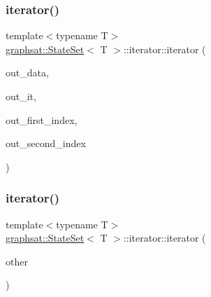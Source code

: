 \mbox{\label{classgraphsat_1_1_state_set_1_1iterator_a1b8267daf558c09335c788da43e76c77}} 
\subsubsection{\texorpdfstring{iterator()}{iterator()}\hspace{0.1cm}{\footnotesize\ttfamily [2/3]}}
{\footnotesize\ttfamily template$<$typename T$>$ \\
\mbox{\hyperlink{classgraphsat_1_1_state_set}{graphsat\+::\+State\+Set}}$<$ T $>$\+::iterator\+::iterator (\begin{DoxyParamCaption}\item[{\mbox{\hyperlink{classgraphsat_1_1_state_set_a6474a59203fade7146aacfd0e277ecf4}{State\+Set\+\_\+t}} $\ast$}]{out\+\_\+data,  }\item[{typename unordered\+\_\+map$<$ int, pair$<$ vector$<$ T $>$, vector$<$ int $>$$>$$>$\+::\mbox{\hyperlink{classgraphsat_1_1_state_set_1_1iterator}{iterator}}}]{out\+\_\+it,  }\item[{size\+\_\+t}]{out\+\_\+first\+\_\+index,  }\item[{size\+\_\+t}]{out\+\_\+second\+\_\+index }\end{DoxyParamCaption})\hspace{0.3cm}{\ttfamily [inline]}}

\mbox{\label{classgraphsat_1_1_state_set_1_1iterator_a03daf90cdc6a7dadbec9e8143401ca33}} 
\subsubsection{\texorpdfstring{iterator()}{iterator()}\hspace{0.1cm}{\footnotesize\ttfamily [3/3]}}
{\footnotesize\ttfamily template$<$typename T$>$ \\
\mbox{\hyperlink{classgraphsat_1_1_state_set}{graphsat\+::\+State\+Set}}$<$ T $>$\+::iterator\+::iterator (\begin{DoxyParamCaption}\item[{const \mbox{\hyperlink{classgraphsat_1_1_state_set_1_1iterator}{iterator}} \&}]{other }\end{DoxyParamCaption})\hspace{0.3cm}{\ttfamily [inline]}}



